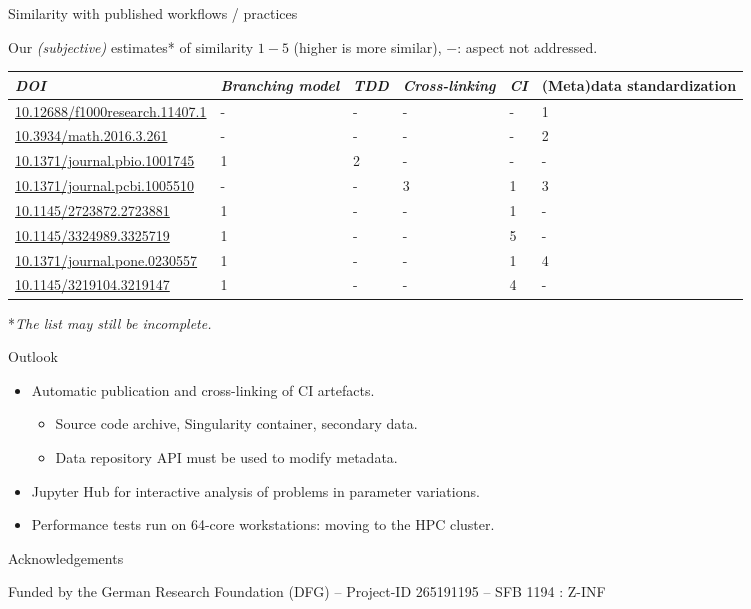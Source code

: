 \documentclass[
	ngerman,%
	aspectratio=169,%
	color={accentcolor=2d},
	logo=true,%
	colorframetitle=true,%
	]{tudabeamer}
\begin{document}
\begin{frame}{Similarity with published workflows / practices}

	\vfill
	Our \emph{(subjective)} estimates* of similarity $1-5$ (higher is more similar), $-$: aspect not addressed.
	\begin{center}
		\scriptsize
		\begin{tabular}{@{} *6l @{}}    \toprule
				\emph{DOI} & \emph{Branching model} & \emph{TDD} & \emph{Cross-linking} & \emph{CI}  & (Meta)data standardization \\\midrule
				 \href{https://doi.org/10.12688/f1000research.11407.1}{10.12688/f1000research.11407.1} 
					 & -  & -  & -  & - & 1  \\ 
				 \href{https://doi.org/10.3934/math.2016.3.261}{10.3934/math.2016.3.261} 
					 & -  & -  & -  & - & 2  \\ 
				 \href{https://doi.org/10.1371/journal.pbio.1001745}{10.1371/journal.pbio.1001745} 
					 & 1  & 2  & -  & - & -  \\ 
				 \href{https://doi.org/10.1371/journal.pcbi.1005510}{10.1371/journal.pcbi.1005510}
					 & -  & -  & 3 & 1 & 3  \\ 
				 \href{https://doi.org/10.1145/2723872.2723881}{10.1145/2723872.2723881}
					 & 1  & -  & - & 1 & -  \\ 
				 \href{https://dl.acm.org/doi/10.1145/3324989.3325719}{10.1145/3324989.3325719}
					 & 1  & -  & - & 5 & -  \\ 
				 \href{https://doi.org/10.1371/journal.pone.0230557}{10.1371/journal.pone.0230557}
					 & 1  & -  & - & 1 & 4  \\ 
				 \href{https://doi.org/10.1145/3219104.3219147}{10.1145/3219104.3219147} 
					 & 1  & -  & -  & 4 & - \\\bottomrule
				 \hline
		\end{tabular}
	\end{center}
	
	*\emph{The list may still be incomplete.}
	
\end{frame}

\begin{frame}{Outlook}
	\vfill
	\begin{itemize}
		\item Automatic publication and cross-linking of CI artefacts. 
			\begin{itemize}
				\item Source code archive, Singularity container, secondary data. 
				\item Data repository API must be used to modify metadata. 
			\end{itemize}
		\item Jupyter Hub for interactive analysis of problems in parameter variations.
		\item Performance tests run on 64-core workstations: moving to the HPC cluster. 
	\end{itemize}
\end{frame}

\begin{frame}{Acknowledgements}

	\vfill
	{
		Funded by the German Research Foundation (DFG) – Project-ID 265191195 – SFB 1194 : Z-INF
	}

\end{frame}
\end{document}
